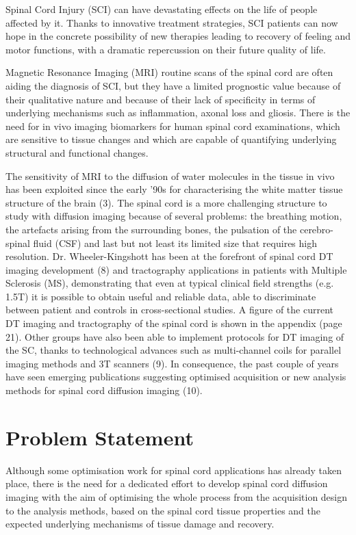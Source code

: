 Spinal Cord Injury (SCI) can have devastating effects on the life of people affected by it. Thanks to innovative treatment strategies, SCI patients can now hope in the concrete possibility of new therapies leading to recovery of feeling and motor functions, with a dramatic repercussion on their future quality of life.

Magnetic Resonance Imaging (MRI) routine scans of the spinal cord are often aiding the diagnosis of SCI, but they have a limited prognostic value because of their qualitative nature and because of their lack of specificity in terms of underlying mechanisms such as inflammation, axonal loss and gliosis. There is the need for in vivo imaging biomarkers for human spinal cord examinations, which are sensitive to tissue changes and which are capable of quantifying underlying structural and functional changes.

The sensitivity of MRI to the diffusion of water molecules in the tissue in vivo has been exploited since the early ’90s for characterising the white matter tissue structure of the brain (3).  The spinal cord is a more challenging structure to study with diffusion imaging because of several problems: the breathing motion, the artefacts arising from the surrounding bones, the pulsation of the cerebro-spinal fluid (CSF) and last but not least its limited size that requires high resolution. Dr. Wheeler-Kingshott  has been at the forefront of spinal cord DT imaging development (8) and tractography applications in patients with Multiple Sclerosis (MS), demonstrating that even at typical clinical field strengths (e.g. 1.5T) it is possible to obtain useful and reliable data, able to discriminate between patient and controls in cross-sectional studies. A figure of the current DT imaging and tractography of the spinal cord is shown in the appendix (page 21). Other groups have also been able to implement protocols for DT imaging of the SC, thanks to technological advances such as multi-channel coils for parallel imaging methods and 3T scanners (9). In consequence, the past couple of years have seen emerging publications suggesting optimised acquisition or new analysis methods for spinal cord diffusion imaging (10).

\section{Problem Statement}
Although some optimisation work for spinal cord applications has already taken place, there is the need for a dedicated effort to develop spinal cord diffusion imaging with the aim of optimising the whole process from the acquisition design to the analysis methods, based on the spinal cord tissue properties and the expected underlying mechanisms of tissue damage and recovery.

